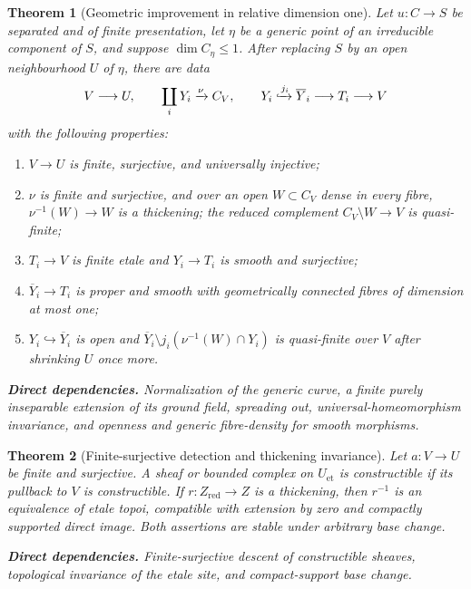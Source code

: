 \documentclass[10pt]{article}
\newtheorem{theorem}{Theorem}[section]
\theoremstyle{definition}
\newcommand{\deps}[1]{\par\smallskip\noindent\textbf{Direct dependencies.} #1}
\begin{document}
\begin{theorem}[Geometric improvement in relative dimension one]
\label{thm:stratified-curve-compactification}
Let $u:C\to S$ be separated and of finite presentation, let $\eta$ be a
generic point of an irreducible component of $S$, and suppose
$\dim C_\eta\leq1$.  After replacing $S$ by an open neighbourhood $U$ of
$\eta$, there are data
\[
 V\longrightarrow U,
 \qquad
 \coprod_iY_i\xrightarrow{\nu}C_V,
 \qquad
 Y_i\xhookrightarrow{j_i}\overline Y_i\longrightarrow T_i\longrightarrow V
\]
with the following properties:
\begin{enumerate}
\item $V\to U$ is finite, surjective, and universally injective;
\item $\nu$ is finite and surjective, and over an open $W\subset C_V$ dense
      in every fibre, $\nu^{-1}(W)\to W$ is a thickening; the reduced
      complement $C_V\setminus W\to V$ is quasi-finite;
\item $T_i\to V$ is finite etale and $Y_i\to T_i$ is smooth and surjective;
\item $\overline Y_i\to T_i$ is proper and smooth with geometrically
      connected fibres of dimension at most one;
\item $Y_i\hookrightarrow\overline Y_i$ is open and
      $\overline Y_i\setminus j_i(\nu^{-1}(W)\cap Y_i)$ is quasi-finite over
      $V$ after shrinking $U$ once more.
\end{enumerate}
\deps{Normalization of the generic curve, a finite purely inseparable
extension of its ground field, spreading out, universal-homeomorphism
invariance, and openness and generic fibre-density for smooth morphisms.}
\end{theorem}

\begin{theorem}[Finite-surjective detection and thickening invariance]
\label{thm:finite-surjective-detection}
Let $a:V\to U$ be finite and surjective.  A sheaf or bounded complex on
$U_{\mathrm{et}}$ is constructible if its pullback to $V$ is constructible.
If $r:Z_{\mathrm{red}}\to Z$ is a thickening, then $r^{-1}$ is an equivalence
of etale topoi, compatible with extension by zero and compactly supported
direct image.  Both assertions are stable under arbitrary base change.
\deps{Finite-surjective descent of constructible sheaves, topological
invariance of the etale site, and compact-support base change.}
\end{theorem}
\end{document}
